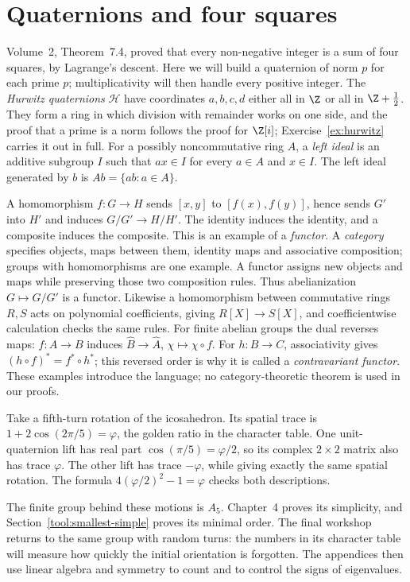 \section{Quaternions and four squares}

Volume~2, Theorem~7.4, proved that every non-negative integer is a sum of four squares, by
Lagrange's descent. Here we will build a quaternion of norm $p$ for each prime
$p$; multiplicativity will then handle every positive integer. The
\emph{Hurwitz quaternions} $\mathcal H$ have coordinates $a,b,c,d$ either all
in $\Z$ or all in $\Z+\frac12$.
They form a ring in which division with remainder works on one side, and the proof that a prime is a norm follows the proof for $\Z[i]$; Exercise~\ref{ex:hurwitz} carries it out in full.
For a possibly noncommutative ring $A$, a \emph{left ideal} is an additive
subgroup $I$ such that $ax\in I$ for every $a\in A$ and $x\in I$.
The left ideal generated by $b$ is $Ab=\{ab:a\in A\}$.

\begin{remark}
A homomorphism $f:G\to H$ sends $[x,y]$ to $[f(x),f(y)]$, hence sends
$G'$ into $H'$ and induces $G/G'\to H/H'$. The identity induces the
identity, and a composite induces the composite. This is an example of a
\emph{functor}. A \emph{category} specifies objects, maps between them,
identity maps and associative composition; groups with homomorphisms are
one example. A functor assigns new objects and maps while preserving those
two composition rules. Thus abelianization $G\mapsto G/G'$ is a functor.
Likewise a homomorphism between commutative rings $R,S$ acts on polynomial coefficients, giving $R[X]\to S[X]$, and coefficientwise calculation checks the same rules.
For finite abelian groups the dual reverses maps: $f:A\to B$ induces
$\widehat B\to\widehat A$, $\chi\mapsto\chi\circ f$.
For $h:B\to C$, associativity gives $(h\circ f)^*=f^*\circ h^*$; this reversed order is why it is called a \emph{contravariant functor}. These examples introduce the language;
no category-theoretic theorem is used in our proofs.
\end{remark}

\begin{beauty}
Take a fifth-turn rotation of the icosahedron. Its spatial trace is
$1+2\cos(2\pi/5)=\varphi$, the golden ratio in the character table.
One unit-quaternion lift has real part $\cos(\pi/5)=\varphi/2$, so its
complex $2\times2$ matrix also has trace $\varphi$.
The other lift has trace $-\varphi$, while giving exactly the same spatial
rotation. The formula $4(\varphi/2)^2-1=\varphi$ checks both descriptions.

The finite group behind these motions is $A_5$. Chapter~4 proves its simplicity, and Section~\ref{tool:smallest-simple} proves its minimal order.
The final workshop returns to the same group with random turns: the numbers
in its character table will measure how quickly the initial orientation
is forgotten. The appendices then use linear algebra and symmetry to count
and to control the signs of eigenvalues.
\end{beauty}

